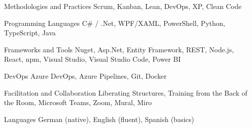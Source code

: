 {
}


\begin{cvskills}
	\cvskill
	{
		{Methodologies and Practices}
	} %
	{
		{Scrum, Kanban, Lean, DevOps, XP, Clean Code}
	} %

  \cvskill
    {
    	{Programming Languages}
    } %
    {C\# / .Net, WPF/XAML, PowerShell, Python, TypeScript, Java} %

  \cvskill
    {
    	{Frameworks and Tools}
    } %
    {Nuget, Asp.Net, Entity Framework, REST, Node.js, React, npm, Visual Studio, Visual Studio Code, Power BI} %

  \cvskill
    {
    	{DevOps}
    } %
    {Azure DevOps, Azure Pipelines, Git, Docker} %

  \cvskill
	{
		{Facilitation and Collaboration}
	} %
	{Liberating Structures, Training from the Back of the Room, Microsoft Teams, Zoom, Mural, Miro} %

  \cvskill
    {
    	{Languages}
    } %
    {
    	{German (native), English (fluent), Spanish (basics)}
    } %

\end{cvskills}
